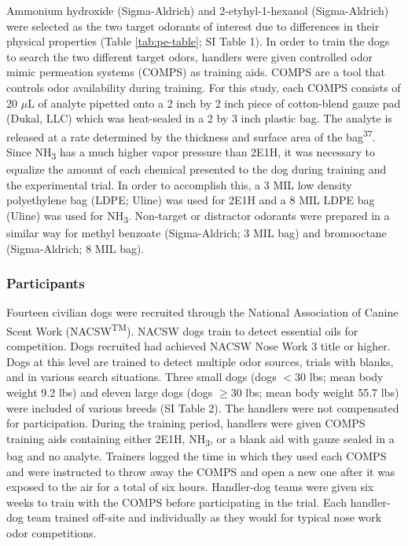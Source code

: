 \documentclass[
]{article}
\begin{document}
Ammonium hydroxide (Sigma-Aldrich) and 2-etyhyl-1-hexanol (Sigma-Aldrich) were selected as the two target odorants of interest due to differences in their physical properties (Table \ref{tab:pe-table}; SI Table 1). In order to train the dogs to search the two different target odors, handlers were given controlled odor mimic permeation systems (COMPS) as training aids. COMPS are a tool that controls odor availability during training. For this study, each COMPS consists of 20 \(\mu\)L of analyte pipetted onto a 2 inch by 2 inch piece of cotton-blend gauze pad (Dukal, LLC) which was heat-sealed in a 2 by 3 inch plastic bag. The analyte is released at a rate determined by the thickness and surface area of the bag\textsuperscript{37}. Since NH\textsubscript{3} has a much higher vapor pressure than 2E1H, it was necessary to equalize the amount of each chemical presented to the dog during training and the experimental trial. In order to accomplish this, a 3 MIL low density polyethylene bag (LDPE; Uline) was used for 2E1H and a 8 MIL LDPE bag (Uline) was used for NH\textsubscript{3}. Non-target or distractor odorants were prepared in a similar way for methyl benzoate (Sigma-Aldrich; 3 MIL bag) and bromooctane (Sigma-Aldrich; 8 MIL bag).

\hypertarget{participants}{%
\subsubsection{Participants}\label{participants}}

Fourteen civilian dogs were recruited through the National Association of Canine Scent Work (NACSW\textsuperscript{TM}). NACSW dogs train to detect essential oils for competition. Dogs recruited had achieved NACSW Nose Work 3 title or higher. Dogs at this level are trained to detect multiple odor sources, trials with blanks, and in various search situations. Three small dogs (dogs \(< 30\) lbs; mean body weight 9.2 lbs) and eleven large dogs (dogs \(\geq 30\) lbs; mean body weight 55.7 lbs) were included of various breeds (SI Table 2). The handlers were not compensated for participation. During the training period, handlers were given COMPS training aids containing either 2E1H, NH\textsubscript{3}, or a blank aid with gauze sealed in a bag and no analyte. Trainers logged the time in which they used each COMPS and were instructed to throw away the COMPS and open a new one after it was exposed to the air for a total of six hours. Handler-dog teams were given six weeks to train with the COMPS before participating in the trial. Each handler-dog team trained off-site and individually as they would for typical nose work odor competitions.
\end{document}
